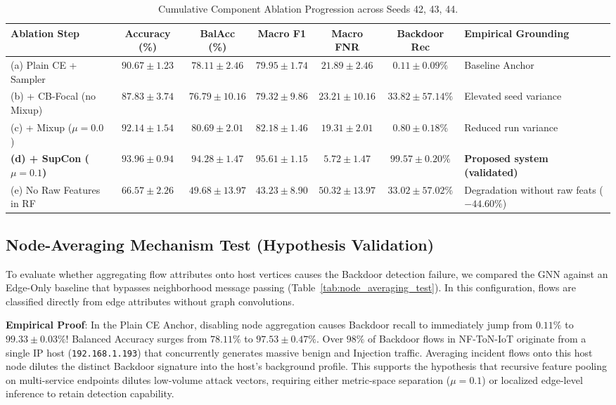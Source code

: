 \documentclass[12pt,a4paper]{report}
\begin{document}
\begin{table}[H]
\centering
\caption{Cumulative Component Ablation Progression across Seeds 42, 43, 44.}
\label{tab:ablation_progression}
\footnotesize
\setlength{\tabcolsep}{3pt}
\begin{tabularx}{\textwidth}{l c c c c c X}
\toprule
\textbf{Ablation Step} & \textbf{Accuracy (\%)} & \textbf{BalAcc (\%)} & \textbf{Macro F1} & \textbf{Macro FNR} & \textbf{Backdoor Rec} & \textbf{Empirical Grounding} \\
\midrule
(a) Plain CE + Sampler & $90.67 \pm 1.23$ & $78.11 \pm 2.46$ & $79.95 \pm 1.74$ & $21.89 \pm 2.46$ & $0.11 \pm 0.09\%$ & Baseline Anchor \\
(b) + CB-Focal (no Mixup) & $87.83 \pm 3.74$ & $76.79 \pm 10.16$ & $79.32 \pm 9.86$ & $23.21 \pm 10.16$ & $33.82 \pm 57.14\%$ & Elevated seed variance \\
(c) + Mixup ($\mu=0.0$) & $92.14 \pm 1.54$ & $80.69 \pm 2.01$ & $82.18 \pm 1.46$ & $19.31 \pm 2.01$ & $0.80 \pm 0.18\%$ & Reduced run variance \\
\textbf{(d) + SupCon ($\mu=0.1$)} & $\mathbf{93.96 \pm 0.94}$ & $\mathbf{94.28 \pm 1.47}$ & $\mathbf{95.61 \pm 1.15}$ & $\mathbf{5.72 \pm 1.47}$ & $\mathbf{99.57 \pm 0.20\%}$ & \textbf{Proposed system (validated)} \\
(e) No Raw Features in RF & $66.57 \pm 2.26$ & $49.68 \pm 13.97$ & $43.23 \pm 8.90$ & $50.32 \pm 13.97$ & $33.02 \pm 57.02\%$ & Degradation without raw feats ($-44.60\%$) \\
\bottomrule
\end{tabularx}
\end{table}

\subsection{Node-Averaging Mechanism Test (Hypothesis Validation)}
To evaluate whether aggregating flow attributes onto host vertices causes the Backdoor detection failure, we compared the GNN against an Edge-Only baseline that bypasses neighborhood message passing (Table~\ref{tab:node_averaging_test}). In this configuration, flows are classified directly from edge attributes without graph convolutions.

\textbf{Empirical Proof}: In the Plain CE Anchor, disabling node aggregation causes Backdoor recall to immediately jump from $0.11\%$ to $\mathbf{99.33 \pm 0.03\%}$! Balanced Accuracy surges from $78.11\%$ to $\mathbf{97.53 \pm 0.47\%}$. Over $98\%$ of Backdoor flows in NF-ToN-IoT originate from a single IP host (\texttt{192.168.1.193}) that concurrently generates massive benign and Injection traffic. Averaging incident flows onto this host node dilutes the distinct Backdoor signature into the host's background profile. This supports the hypothesis that recursive feature pooling on multi-service endpoints dilutes low-volume attack vectors, requiring either metric-space separation ($\mu = 0.1$) or localized edge-level inference to retain detection capability.
\end{document}
